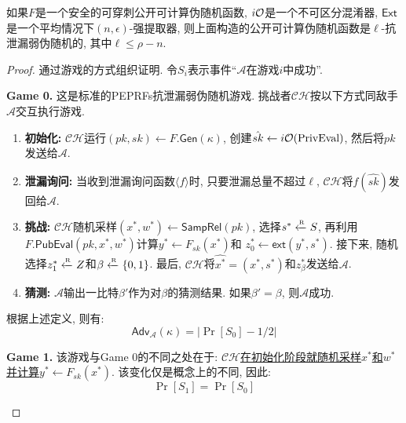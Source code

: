 \begin{theorem}
如果$F$是一个安全的可穿刺公开可计算伪随机函数, $i\mathcal{O}$是一个不可区分混淆器, $\mathsf{Ext}$是一个平均情况下$(n, \epsilon)$-强提取器, 则上面构造的公开可计算伪随机函数是$\ell$-抗泄漏弱伪随机的, 其中$\ell \leq \rho - n$. 
\end{theorem}
\begin{proof}
通过游戏的方式组织证明. 令$S_i$表示事件``$\mathcal{A}$在游戏$i$中成功''.  
\begin{trivlist}
\item \textbf{Game 0.} 这是标准的PEPRFs抗泄漏弱伪随机游戏. 挑战者$\mathcal{CH}$按以下方式同敌手$\mathcal{A}$交互执行游戏.  
\begin{enumerate} \itemsep 1pt \parskip 0pt \parsep 0pt
    \item \textbf{初始化:} $\mathcal{CH}$运行$(pk, sk) \leftarrow F.\mathsf{Gen}(\kappa)$, 创建$\hat{sk} \leftarrow i\mathcal{O}(\text{PrivEval})$, 然后将$pk$发送给$\mathcal{A}$.  

    \item \textbf{泄漏询问:} 当收到泄漏询问函数$\langle f \rangle$时, 只要泄漏总量不超过$\ell$, $\mathcal{CH}$将$f(\hat{sk})$发回给$\mathcal{A}$. 

    \item \textbf{挑战:} $\mathcal{CH}$随机采样$(x^*, w^*) \leftarrow \mathsf{SampRel}(pk)$, 
选择$s^* \xleftarrow{\textup{\tiny R}} S$, 再利用$F.\mathsf{PubEval}(pk, x^*, w^*)$计算$y^* \leftarrow F_{sk}(x^*)$和       $z_0^* \leftarrow \mathsf{ext}(y^*, s^*)$. 接下来, 随机选择$z_1^* \xleftarrow{\textup{\tiny R}} Z$和$\beta \xleftarrow{\textup{\tiny R}} \{0,1\}$. 
        最后, $\mathcal{CH}$将$\hat{x^*} = (x^*, s^*)$和$z_\beta^*$发送给$\mathcal{A}$. 

    \item \textbf{猜测:} $\mathcal{A}$输出一比特$\beta'$作为对$\beta$的猜测结果. 如果$\beta' = \beta$, 则$\mathcal{A}$成功.   
\end{enumerate}
根据上述定义, 则有: 
\begin{equation*}
    \mathsf{Adv}_\mathcal{A}(\kappa) = |\Pr[S_0] - 1/2|
\end{equation*}

\item \textbf{Game 1.} 该游戏与Game 0的不同之处在于: $\mathcal{CH}$\underline{在初始化阶段就随机采样$x^*$和$w^*$并计算$y^* \leftarrow F_{sk}(x^*)$}. 该变化仅是概念上的不同, 因此: 
\begin{equation*}
    \Pr[S_1] = \Pr[S_0]
\end{equation*} 


\end{trivlist}
\end{proof}
